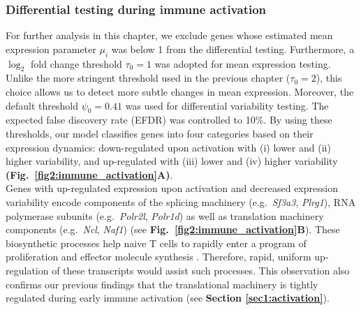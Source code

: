 \subsubsection{Differential testing during immune activation}

For further analysis in this chapter, we exclude genes whose estimated mean expression parameter $\mu_i$ was below 1 from the differential testing. Furthermore, a $\log_2$ fold change threshold $\tau_0 = 1$ was adopted for mean expression testing. Unlike the more stringent threshold used in the previous chapter ($\tau_0 = 2$), this choice allows us to detect more subtle changes in mean expression. Moreover, the default threshold $\psi_0 = 0.41$ was used for differential variability testing. The expected false discovery rate (EFDR) was controlled to 10\%. By using these thresholds, our model classifies genes into four categories based on their expression dynamics: down-regulated upon activation with (i) lower and (ii) higher variability, and up-regulated with (iii) lower and (iv) higher variability \textbf{(Fig.~\ref{fig2:immune_activation}A)}. \\

Genes with up-regulated expression upon activation and decreased expression variability encode components of the splicing machinery (e.g.~\textit{Sf3a3}, \textit{Plrg1}), RNA polymerase subunits (e.g.~\textit{Polr2l}, \textit{Polr1d}) as well as translation machinery components (e.g.~\textit{Ncl}, \textit{Naf1}) (see \textbf{Fig.~\ref{fig2:immune_activation}B}). These biosynthetic processes help naive T cells to rapidly enter a program of proliferation and effector molecule synthesis \citep{Tan2017,Araki2017}. Therefore, rapid, uniform up-regulation of these transcripts would assist such processes. This observation also confirms our previous findings that the translational machinery is tightly regulated during early immune activation (see \textbf{Section \ref{sec1:activation}}).

